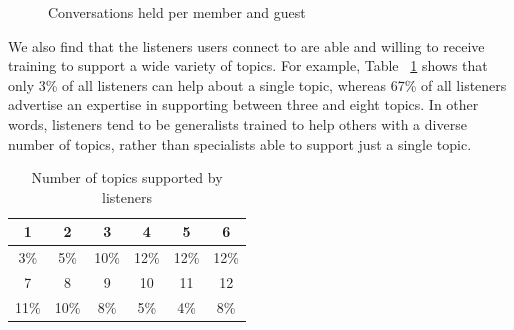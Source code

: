 \begin{figure}[]
\centering
{}
\caption{Conversations held per member and guest}
\label{fig:conv_member_guest}

\end{figure} 

We also find that the listeners users connect to are able and willing to receive training to support a wide variety of topics. For example, Table ~\ref{table 4.5} shows that only 3\% of all listeners can help about a single topic, whereas 67\% of all listeners advertise an expertise in supporting between three and eight topics. In other words, listeners tend to be generalists trained to help others with a diverse number of topics, rather than specialists able to support just a single topic. 

\begin{table}
	\centering
	\begin{tabular}{c c c c c c} 
		1 & 2 & 3 & 4 & 5 & 6 \\ 
		\hline
		3\% & 5\% & 10\% & 12\% & 12\% & 12\%    \\
		\hline
		\hline
		7& 8 & 9 & 10 & 11 & 12 \\
		\hline
		11\% &10\% & 8\% & 5\% & 4\% & 8\%
    \end{tabular}
	\caption{Number of topics supported by listeners}
	\label{table 4.5}
\end{table}

